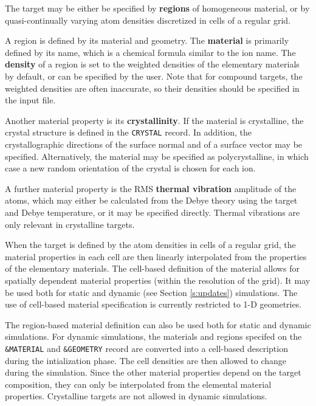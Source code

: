 The target may be either be specified by \textbf{regions} of homogeneous 
material, or by quasi-continually varying atom densities discretized in cells 
of a regular grid.

A region is defined by its material and geometry. The \textbf{material} is
primarily defined by its name, which is a chemical formula similar to the ion
name. The \textbf{density} of a region is set to the weighted densities of the
elementary materials by default, or can be specified by the user. Note that for
compound targets, the weighted densities are often inaccurate, so their
densities should be specified in the input file. 

Another material property is its \textbf{crystallinity}. If the material is
crystalline, the crystal structure is defined in the \texttt{CRYSTAL} record. In
addition, the crystallographic directions of the surface normal and of a surface
vector may be specified. Alternatively, the material may be specified as
polycrystalline, in which case a new random orientation of the crystal is chosen
for each ion. 

A further material property is the RMS \textbf{thermal vibration} amplitude of
the atoms, which may either be calculated from the Debye theory using the target
and Debye temperature, or it may be specified directly. Thermal vibrations are
only relevant in crystalline targets.

When the target is defined by the atom densities in cells of a regular
grid, the material properties in each cell are then linearly interpolated
from the properties of the elementary materials. The cell-based definition
of the material allows for spatially dependent material properties (within
the resolution of the grid). It may be used both for static and dynamic 
(see Section \ref{s:updates}) simulations. The use of cell-based material
specification is currently restricted to 1-D geometries.

The region-based material definition can also be used both for static and
dynamic simulations. For dynamic simulations, the materials and regions 
specifed on the \texttt{\&MATERIAL} and \texttt{\&GEOMETRY} record are
converted into a cell-based description during the intialization phase.
The cell densities are then allowed to change during the simulation. Since the
other material properties depend on the target composition, they can only be 
interpolated from the elemental material properties. Crystalline targets are not
allowed in dynamic simulations. 


